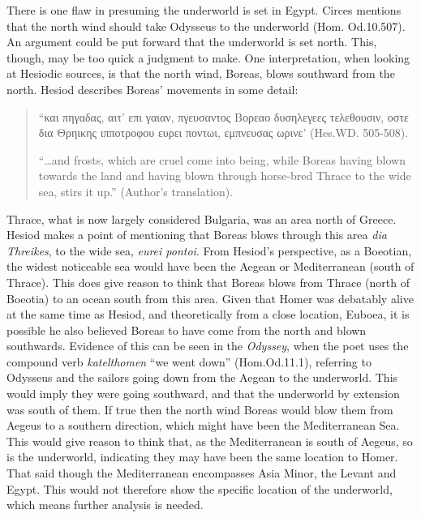 	
	
	
	There is one flaw in presuming the underworld is set in Egypt. Circes mentions that the north wind should take Odysseus to the underworld (Hom. Od.10.507). An argument could be put forward that the underworld is set north. This, though, may be too quick a judgment to make. One interpretation, when looking at Hesiodic sources, is that the north wind, Boreas, blows southward from the north. Hesiod describes Boreas’ movements in some detail:
	
	\begin{quote}
	
	“και πηγαδας, αιτ’ επι γαιαν, πγευσαντος Βορεαο δυσηλεγεες τελεθουσιν,
	οστε δια Θρηικης ιπποτροφου ευρει ποντωι,
	εμπνευσας ωρινε’  (Hes.WD. 505-508).
	
	“…and frosts, which are cruel come into being, while Boreas having blown towards the land and having blown through horse-bred Thrace to the wide sea, stirs it up.” (Author’s translation).
	
	\end{quote}
	
	Thrace, what is now largely considered Bulgaria, was an area north of Greece. Hesiod makes a point of mentioning that Boreas blows through this area \emph{dia Threikes}, to the wide sea, \emph{eurei pontoi}. From Hesiod’s perspective, as a Boeotian, the widest noticeable sea would have been the Aegean or Mediterranean (south of Thrace). This does give reason to think that Boreas blows from Thrace (north of Boeotia) to an ocean south from this area. Given that Homer was debatably alive at the same time as Hesiod, and theoretically from a close location, Euboea, it is possible he also believed Boreas to have come from the north and blown southwards. Evidence of this can be seen in the \emph{Odyssey}, when the poet uses the compound verb \emph{katelthomen} “we went down” (Hom.Od.11.1), referring to Odysseus and the sailors going down from the Aegean to the underworld. This would imply they were going southward, and that the underworld by extension was south of them. If true then the north wind Boreas would blow them from Aegeus to a southern direction, which might have been the Mediterranean Sea. This would give reason to think that, as the Mediterranean is south of Aegeus, so is the underworld, indicating they may have been the same location to Homer. That said though the Mediterranean encompasses Asia Minor, the Levant and Egypt. This would not therefore show the specific location of the underworld, which means further analysis is needed.
	
